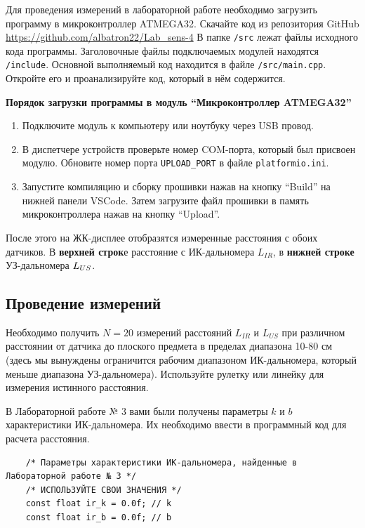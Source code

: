 \documentclass[12pt]{article}
\begin{document}
Для проведения измерений в лабораторной работе необходимо загрузить программу в микроконтроллер ATMEGA32. Скачайте код из репозитория GitHub \url{https://github.com/albatron22/Lab_sens-4} В папке \texttt{/src} лежат файлы исходного кода программы. Заголовочные файлы подключаемых модулей находятся \texttt{/include}. Основной выполняемый код находится в файле \texttt{/src/main.cpp}. Откройте его и проанализируйте код, который в нём содержится.

\textbf{Порядок загрузки программы в модуль ``Микроконтроллер ATMEGA32''}
\begin{enumerate}
	\item Подключите модуль к компьютеру или ноутбуку через USB провод.
	\item В диспетчере устройств проверьте номер COM-порта, который был присвоен модулю. Обновите номер порта \texttt{UPLOAD\_PORT} в файле \texttt{platformio.ini}.
	
	\item Запустите компиляцию и сборку прошивки нажав на кнопку ``Build'' на нижней панели VSCode. Затем загрузите файл прошивки в память микроконтроллера нажав на кнопку ``Upload''.
\end{enumerate}
 

После этого на ЖК-дисплее отобразятся измеренные расстояния с обоих датчиков. В \textbf{верхней строк}е расстояние с ИК-дальномера \(L_{IR}\), в \textbf{нижней строке} УЗ-дальномера \(L_{US\\}\).

\subsection{Проведение измерений}

Необходимо получить \(N=20\) измерений расстояний \(L_{IR}\) и \(L_{US}\) при различном расстоянии от датчика до плоского предмета в пределах диапазона 10-80 см (здесь мы вынуждены ограничится рабочим диапазоном ИК-дальномера, который меньше диапазона УЗ-дальномера). Используйте рулетку или линейку для измерения истинного расстояния.

В Лабораторной работе № 3 вами были получены параметры \(k\) и \(b\) характеристики ИК-дальномера. Их необходимо ввести в программный код для расчета расстояния.

\begin{verbatim}
	/* Параметры характеристики ИК-дальномера, найденные в Лабораторной работе № 3 */
	/* ИСПОЛЬЗУЙТЕ СВОИ ЗНАЧЕНИЯ */
	const float ir_k = 0.0f; // k
	const float ir_b = 0.0f; // b
\end{verbatim}
\end{document}
